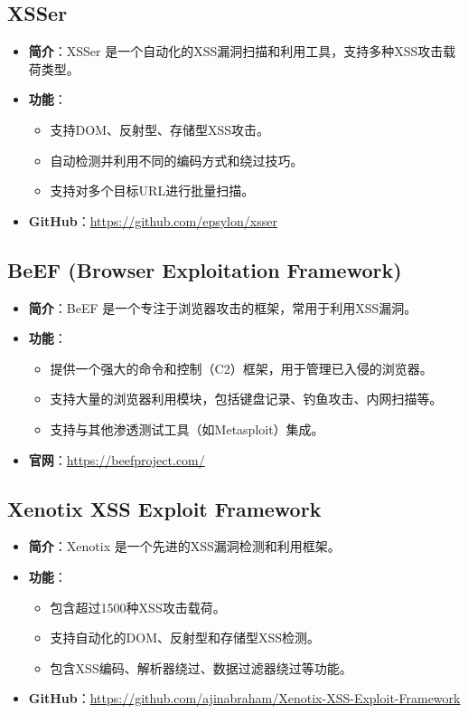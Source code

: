 \documentclass{article}
\begin{document}
\subsection{XSSer}
\begin{itemize}
    \item \textbf{简介}：XSSer 是一个自动化的XSS漏洞扫描和利用工具，支持多种XSS攻击载荷类型。
    \item \textbf{功能}：
        \begin{itemize}
            \item 支持DOM、反射型、存储型XSS攻击。
            \item 自动检测并利用不同的编码方式和绕过技巧。
            \item 支持对多个目标URL进行批量扫描。
        \end{itemize}
    \item \textbf{GitHub}：\url{https://github.com/epsylon/xsser}
\end{itemize}

\subsection{BeEF (Browser Exploitation Framework)}
\begin{itemize}
\item \textbf{简介}：BeEF 是一个专注于浏览器攻击的框架，常用于利用XSS漏洞。
\item \textbf{功能}：
\begin{itemize}
\item 提供一个强大的命令和控制（C2）框架，用于管理已入侵的浏览器。
\item 支持大量的浏览器利用模块，包括键盘记录、钓鱼攻击、内网扫描等。
\item 支持与其他渗透测试工具（如Metasploit）集成。
\end{itemize}
\item \textbf{官网}：\url{https://beefproject.com/}
\end{itemize}

\subsection{Xenotix XSS Exploit Framework}
\begin{itemize}
\item \textbf{简介}：Xenotix 是一个先进的XSS漏洞检测和利用框架。
\item \textbf{功能}：
\begin{itemize}
\item 包含超过1500种XSS攻击载荷。
\item 支持自动化的DOM、反射型和存储型XSS检测。
\item 包含XSS编码、解析器绕过、数据过滤器绕过等功能。
\end{itemize}
\item \textbf{GitHub}：\url{https://github.com/ajinabraham/Xenotix-XSS-Exploit-Framework}
\end{itemize}
\end{document}

